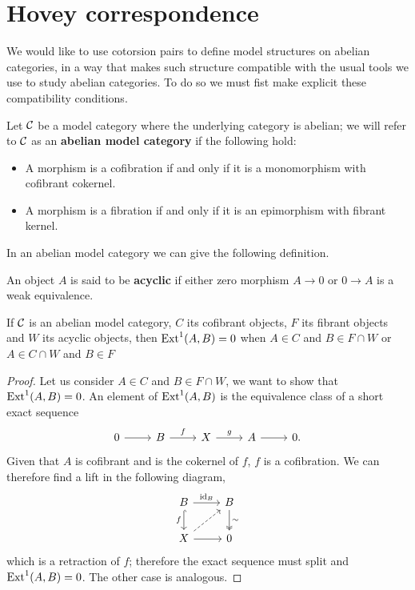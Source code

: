 \section{Hovey correspondence}

We would like to use cotorsion pairs to define model structures on abelian categories, in a way that makes such structure compatible with the usual tools we use to study abelian categories. To do so we must fist make explicit these compatibility conditions.


\begin{definition}
	Let $\mathcal{C}$ be a model category where the underlying category is abelian; we will refer to $\mathcal{C}$ as an \textbf{abelian model category} if the following hold:
	\begin{itemize}
		\item A morphism is a cofibration if and only if it is a monomorphism with cofibrant cokernel.
		\item A morphism is a fibration if and only if it is an epimorphism with fibrant kernel.
	\end{itemize}
\end{definition}

In an abelian model category we can give the following definition.

\begin{definition}
	An object $A$ is said to be \textbf{acyclic} if either zero morphism $A \longrightarrow 0$ or $0 \longrightarrow A$ is a weak equivalence. 
\end{definition}

\begin{lemma}
	\label{lem:ext-model}
	If $\mathcal{C}$ is an abelian model category, $C$ its cofibrant objects, $F$ its fibrant objects and $W$ its acyclic objects, then $\mathrm{Ext}^1(A,B) = 0$ when $A\in C$ and $B \in F\cap W$ or $A\in C\cap W$ and $B\in F$
\end{lemma}

\begin{proof}
	Let us consider $A \in C$ and $B \in F\cap W$, we want to show that $\mathrm{Ext}^1(A,B) = 0$. An element of $\mathrm{Ext}^1(A,B)$ is the equivalence class of a short exact sequence
	\[\begin{tikzcd}
		0 & B & X & A & {0.}
		\arrow[from=1-1, to=1-2]
		\arrow["f", from=1-2, to=1-3]
		\arrow["g", from=1-3, to=1-4]
		\arrow[from=1-4, to=1-5]
	\end{tikzcd}\]
	Given that $A$ is cofibrant and is the cokernel of $f$, $f$ is a cofibration. We can therefore find a lift in the following diagram,
	\[\begin{tikzcd}
		B & B \\
		X & {0}
		\arrow["{\id_B}", from=1-1, to=1-2]
		\arrow["f"', hook, from=1-1, to=2-1]
		\arrow["\sim", two heads, from=1-2, to=2-2]
		\arrow[dashed, from=2-1, to=1-2]
		\arrow[from=2-1, to=2-2]
	\end{tikzcd}\]
	which is a retraction of $f$; therefore the exact sequence must split and $\mathrm{Ext}^1(A,B) = 0$. The other case is analogous.
\end{proof}


